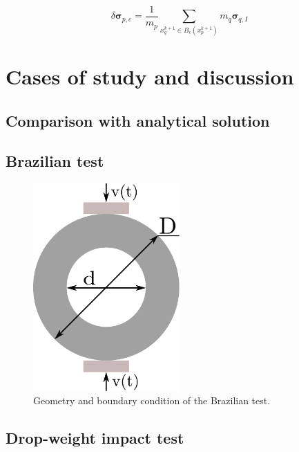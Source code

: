 \documentclass[preprint,12pt,a4paper]{elsarticle}
\newcommand{\tens}[1]{
  \ensuremath{\mathbf{{#1}}}
}
\begin{document}
\begin{equation}
  \label{eq:equivalent-critical-stress}
  \delta \tens{\sigma}_{p,c} =
  \frac{1}{m_p} \sum_{x_q^{k+1} \in
  B_{\epsilon}(x_p^{k+1})} m_q \tens{\sigma}_{q,I} 
\end{equation}

\section{Cases of study and discussion}
\label{sec:3}

\subsection{Comparison with analytical solution}
\label{sec:3.1}

\subsection{Brazilian test}
\label{sec:3.2}

\begin{figure}
  \centering
  \includegraphics[width=0.5\textwidth]{Figures/Brazilian}
  \caption{Geometry and boundary condition of the Brazilian test.}
  \label{fig:geometry-brazilian-test}
\end{figure}

\subsection{Drop-weight impact test}
\label{sec:3.3}
\end{document}
